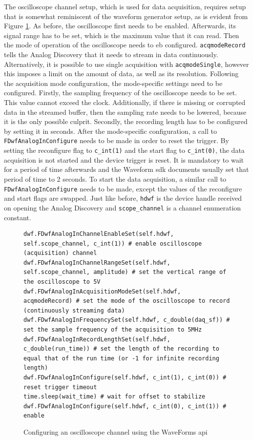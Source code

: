 The oscilloscope channel setup, which is used for data acquisition, requires setup that is somewhat reminiscent of the waveform generator setup, as is evident from Figure \ref{fig:td:daq_setup}. As before, the oscilloscope first needs to be enabled. Afterwards, its signal range has to be set, which is the maximum value that it can read. Then the mode of operation of the oscilloscope needs to eb configured. \lstinline|acqmodeRecord| tells the Analog Discovery that it needs to stream in data continuously. Alternatively, it is possible to use single acquisition with \lstinline|acqmodeSingle|, however this imposes a limit on the amount of data, as well as its resolution. Following the acquisition mode configuration, the mode-specific settings need to be configured. Firstly, the sampling frequency of the oscilloscope needs to be set. This value cannot exceed the clock. Additionally, if there is missing or corrupted data in the streamed buffer, then the sampling rate needs to be lowered, because it is the only possible culprit. Secondly, the recording length has to be configured by setting it in seconds. After the mode-specific configuration, a call to \lstinline|FDwfAnalogInConfigure| needs to be made in order to reset the trigger. By setting the reconfigure flag to \lstinline|c_int(1)| and the start flag to \lstinline|c_int(0)|, the data acquisition is not started and the device trigger is reset. It is mandatory to wait for a period of time afterwards and the Waveform \gls{sdk} documents usually set that period of time to 2 seconds. To start the data acquisition, a similar call to \lstinline|FDwfAnalogInConfigure| needs to be made, except the values of the reconfigure and start flags are swapped. Just like before, \lstinline|hdwf| is the device handle received on opening the Analog Discovery and \lstinline|scope_channel| is a channel enumeration constant.

\begin{figure}[ht]
	\begin{lstlisting}[language=pythe]		
dwf.FDwfAnalogInChannelEnableSet(self.hdwf, self.scope_channel, c_int(1)) # enable oscilloscope (acquisition) channel
dwf.FDwfAnalogInChannelRangeSet(self.hdwf, self.scope_channel, amplitude) # set the vertical range of the oscilloscope to 5V
dwf.FDwfAnalogInAcquisitionModeSet(self.hdwf, acqmodeRecord) # set the mode of the oscilloscope to record (continuously streaming data)
dwf.FDwfAnalogInFrequencySet(self.hdwf, c_double(daq_sf)) # set the sample frequency of the acquisition to 5MHz
dwf.FDwfAnalogInRecordLengthSet(self.hdwf, c_double(run_time)) # set the length of the recording to equal that of the run time (or -1 for infinite recording length)
dwf.FDwfAnalogInConfigure(self.hdwf, c_int(1), c_int(0)) # reset trigger timeout
time.sleep(wait_time) # wait for offset to stabilize
dwf.FDwfAnalogInConfigure(self.hdwf, c_int(0), c_int(1)) # enable
	\end{lstlisting}
	\caption{Configuring an oscilloscope channel using the WaveForms \gls{api}}
	\label{fig:td:daq_setup}
\end{figure}

